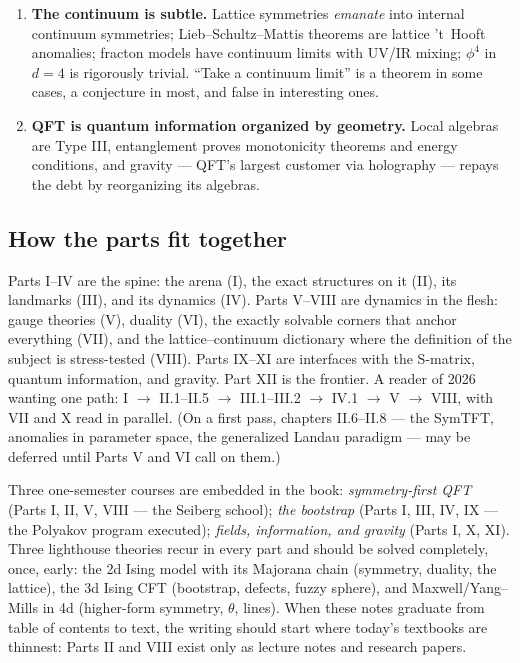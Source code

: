 \begin{enumerate}
\item \textbf{The continuum is subtle.} Lattice symmetries \emph{emanate} into internal continuum symmetries; Lieb--Schultz--Mattis theorems are lattice 't~Hooft anomalies; fracton models have continuum limits with UV/IR mixing; $\phi^4$ in $d=4$ is rigorously trivial. ``Take a continuum limit'' is a theorem in some cases, a conjecture in most, and false in interesting ones.
\item \textbf{QFT is quantum information organized by geometry.} Local algebras are Type III, entanglement proves monotonicity theorems and energy conditions, and gravity --- QFT's largest customer via holography --- repays the debt by reorganizing its algebras.
\end{enumerate}

\subsection*{How the parts fit together}

Parts I--IV are the spine: the arena (I), the exact structures on it (II), its landmarks (III), and its dynamics (IV). Parts V--VIII are dynamics in the flesh: gauge theories (V), duality (VI), the exactly solvable corners that anchor everything (VII), and the lattice--continuum dictionary where the definition of the subject is stress-tested (VIII). Parts IX--XI are interfaces with the S-matrix, quantum information, and gravity. Part XII is the frontier. A reader of 2026 wanting one path: I $\to$ II.1--II.5 $\to$ III.1--III.2 $\to$ IV.1 $\to$ V $\to$ VIII, with VII and X read in parallel. (On a first pass, chapters II.6--II.8 --- the SymTFT, anomalies in parameter space, the generalized Landau paradigm --- may be deferred until Parts V and VI call on them.)

\noin Three one-semester courses are embedded in the book: \emph{symmetry-first QFT} (Parts I, II, V, VIII --- the Seiberg school); \emph{the bootstrap} (Parts I, III, IV, IX --- the Polyakov program executed); \emph{fields, information, and gravity} (Parts I, X, XI). Three lighthouse theories recur in every part and should be solved completely, once, early: the 2d Ising model with its Majorana chain (symmetry, duality, the lattice), the 3d Ising CFT (bootstrap, defects, fuzzy sphere), and Maxwell/Yang--Mills in 4d (higher-form symmetry, $\theta$, lines). When these notes graduate from table of contents to text, the writing should start where today's textbooks are thinnest: Parts II and VIII exist only as lecture notes and research papers.


